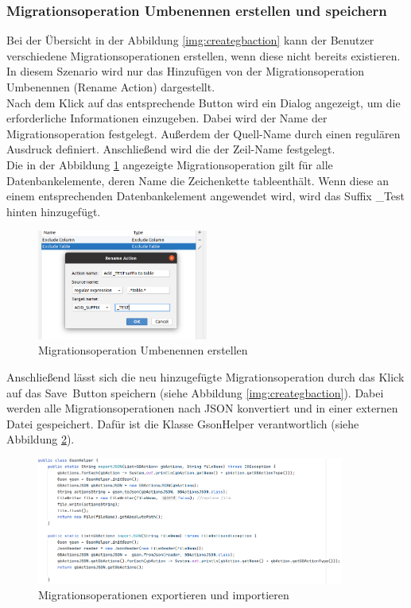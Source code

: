 \subsubsection{Migrationsoperation Umbenennen erstellen und speichern}
Bei der Übersicht in der Abbildung \ref{img:creategbaction} kann der Benutzer verschiedene Migrationsoperationen erstellen, wenn diese nicht bereits existieren. In diesem Szenario wird nur das Hinzufügen von der Migrationsoperation Umbenennen (Rename Action) dargestellt.\\
Nach dem Klick auf das entsprechende Button wird ein Dialog angezeigt, um die erforderliche Informationen einzugeben. Dabei wird der Name der Migrationsoperation festgelegt. Außerdem der Quell-Name durch einen regulären Ausdruck definiert. Anschließend  wird die der Zeil-Name festgelegt. \\
Die in der Abbildung \ref{img:createRename} angezeigte Migrationsoperation gilt für alle Datenbankelemente, deren Name die Zeichenkette \glqq table\grqq enthält. Wenn diese an einem entsprechenden Datenbankelement angewendet wird, wird das Suffix \glqq \_Test\grqq \, hinten hinzugefügt.
\begin{figure}[h]
	\centering
	\includegraphics[width=0.5\textwidth]{images/ui/createRename}
	\caption{Migrationsoperation Umbenennen erstellen}
	\label{img:createRename}
\end{figure}
Anschließend lässt sich die neu hinzugefügte Migrationsoperation durch das Klick auf das \glqq Save\grqq \, Button speichern (siehe Abbildung \ref{img:creategbaction}). Dabei werden alle Migrationsoperationen nach JSON konvertiert und in einer externen Datei gespeichert. Dafür ist die Klasse GsonHelper verantwortlich (siehe Abbildung \ref{img:gson}).
\begin{figure}[h]
	\centering
	\includegraphics[width=0.9\textwidth]{images/ui/gson}
	\caption{Migrationsoperationen exportieren und importieren}
	\label{img:gson}
\end{figure}



